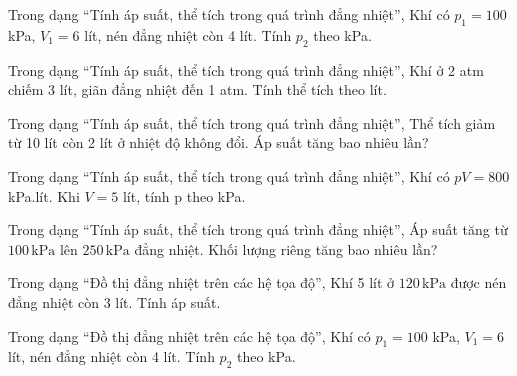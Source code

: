 \begin{ex}
Trong dạng “Tính áp suất, thể tích trong quá trình đẳng nhiệt”, Khí có $p_1=100$ kPa, $V_1=6$ lít, nén đẳng nhiệt còn 4 lít. Tính $p_2$ theo kPa.
\end{ex}

\begin{ex}
Trong dạng “Tính áp suất, thể tích trong quá trình đẳng nhiệt”, Khí ở 2 atm chiếm 3 lít, giãn đẳng nhiệt đến 1 atm. Tính thể tích theo lít.
\end{ex}

\begin{ex}
Trong dạng “Tính áp suất, thể tích trong quá trình đẳng nhiệt”, Thể tích giảm từ 10 lít còn 2 lít ở nhiệt độ không đổi. Áp suất tăng bao nhiêu lần?
\end{ex}

\begin{ex}
Trong dạng “Tính áp suất, thể tích trong quá trình đẳng nhiệt”, Khí có $pV=800$ kPa.lít. Khi $V=5$ lít, tính p theo kPa.
\end{ex}

\begin{ex}
Trong dạng “Tính áp suất, thể tích trong quá trình đẳng nhiệt”, Áp suất tăng từ $100\,\text{kPa}$ lên $250\,\text{kPa}$ đẳng nhiệt. Khối lượng riêng tăng bao nhiêu lần?
\end{ex}

\begin{bt}
Trong dạng “Đồ thị đẳng nhiệt trên các hệ tọa độ”, Khí 5 lít ở $120\,\text{kPa}$ được nén đẳng nhiệt còn 3 lít. Tính áp suất.
\end{bt}

\begin{ex}
Trong dạng “Đồ thị đẳng nhiệt trên các hệ tọa độ”, Khí có $p_1=100$ kPa, $V_1=6$ lít, nén đẳng nhiệt còn 4 lít. Tính $p_2$ theo kPa.
\end{ex}

